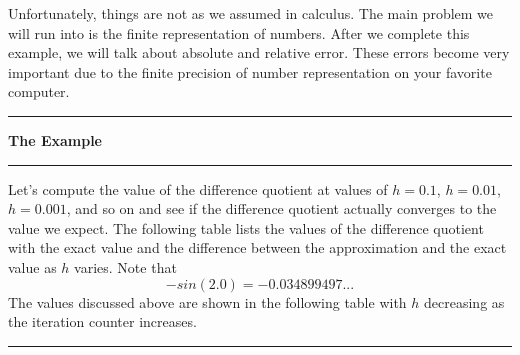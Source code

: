 \documentclass[10pt,fleqn]{article}
\begin{document}
Unfortunately, things are not as we assumed in calculus. The main problem we
will run into is the finite representation of numbers. After we complete this
example, we will talk about absolute and relative error. These errors become
very important due to the finite precision of number representation on your
favorite computer.
\vskip0.1in\hrule\vskip0.1in\noindent
{\bf The Example}
\vskip0.1in\hrule\vskip0.1in\noindent
Let's compute the value of the difference quotient at values of \(h=0.1\),
\(h=0.01\), \(h=0.001\), and so on and see if the difference quotient actually
converges to the value we expect. The following table lists the values of the
difference quotient with the exact value and the difference between the
approximation and the exact value as \(h\) varies. Note that
\[
  -sin(2.0) = -0.034899497...
\]
The values discussed above are shown in the following table with \(h\)
decreasing as the iteration counter increases.
\vskip0.1in\hrule\vskip0.1in\noindent
\end{document}
